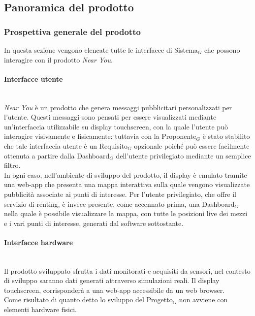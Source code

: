\documentclass[10pt]{article}
\begin{document}
\begin{justify}
\subsection{Panoramica del prodotto}
\subsubsection{Prospettiva generale del prodotto} 
In questa sezione vengono elencate tutte le interfacce di Sistema$_G$ che possono interagire con il prodotto \textit{Near You}.

\paragraph{Interfacce utente}\mbox{}\\
\textit{Near You} è un prodotto che genera messaggi pubblicitari personalizzati per l'utente. Questi messaggi sono pensati per essere visualizzati mediante un'interfaccia utilizzabile su display touchscreen, con la quale l'utente può interagire visivamente e fisicamente; tuttavia con la Proponente$_G$ è stato stabilito che tale interfaccia utente 
è un Requisito$_G$ opzionale poiché può essere facilmente ottenuta a partire dalla Dashboard$_G$ dell'utente privilegiato mediante un semplice filtro.\\
In ogni caso, nell'ambiente di sviluppo del prodotto, il display è emulato tramite una web-app che presenta una mappa interattiva sulla quale vengono visualizzate pubblicità associate ai punti di interesse. Per l'utente 
privilegiato, che offre il servizio di renting, è invece presente, come accennato prima, una Dashboard$_G$ nella quale è possibile visualizzare la mappa, con tutte le posizioni live dei mezzi e i vari punti di interesse, 
generati dal software sottostante.

\paragraph{Interfacce hardware}\mbox{}\\
Il prodotto sviluppato sfrutta i dati monitorati e acquisiti da sensori, nel contesto di sviluppo saranno dati generati attraverso simulazioni reali. Il display touchscreen, corrisponderà a una web-app accessibile da un web browser.\\
Come risultato di quanto detto lo sviluppo del Progetto$_G$ non avviene con elementi hardware fisici.


\end{justify}
\end{document}

